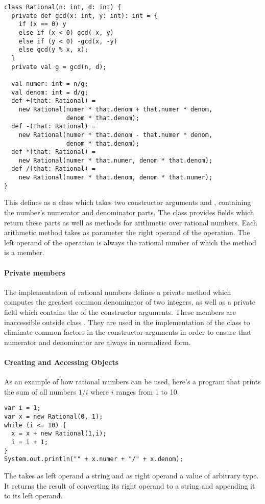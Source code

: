 \begin{lstlisting}
class Rational(n: int, d: int) {
  private def gcd(x: int, y: int): int = {
    if (x == 0) y
    else if (x < 0) gcd(-x, y)
    else if (y < 0) -gcd(x, -y)
    else gcd(y % x, x);
  }
  private val g = gcd(n, d);

  val numer: int = n/g;
  val denom: int = d/g;
  def +(that: Rational) =
    new Rational(numer * that.denom + that.numer * denom,
                 denom * that.denom);
  def -(that: Rational) =
    new Rational(numer * that.denom - that.numer * denom, 
                 denom * that.denom);
  def *(that: Rational) =
    new Rational(numer * that.numer, denom * that.denom);
  def /(that: Rational) =
    new Rational(numer * that.denom, denom * that.numer);
}
\end{lstlisting}
This defines  as a class which takes two constructor
arguments  and , containing the number's numerator and
denominator parts.  The class provides fields which return these parts
as well as methods for arithmetic over rational numbers.  Each
arithmetic method takes as parameter the right operand of the
operation. The left operand of the operation is always the rational
number of which the method is a member.

\paragraph{Private members}
The implementation of rational numbers defines a private method
 which computes the greatest common denominator of two
integers, as well as a private field  which contains the
 of the constructor arguments. These members are inaccessible
outside class . They are used in the implementation of
the class to eliminate common factors in the constructor arguments in
order to ensure that numerator and denominator are always in
normalized form.

\paragraph{Creating and Accessing Objects}
As an example of how rational numbers can be used, here's a program
that prints the sum of all numbers $1/i$ where $i$ ranges from 1 to 10.
\begin{lstlisting}
var i = 1;
var x = new Rational(0, 1);
while (i <= 10) {
  x = x + new Rational(1,i);
  i = i + 1;
}
System.out.println("" + x.numer + "/" + x.denom);
\end{lstlisting}
The \code{+} takes as left operand a string and as right operand a
value of arbitrary type. It returns the result of converting its right
operand to a string and appending it to its left operand. 
  

